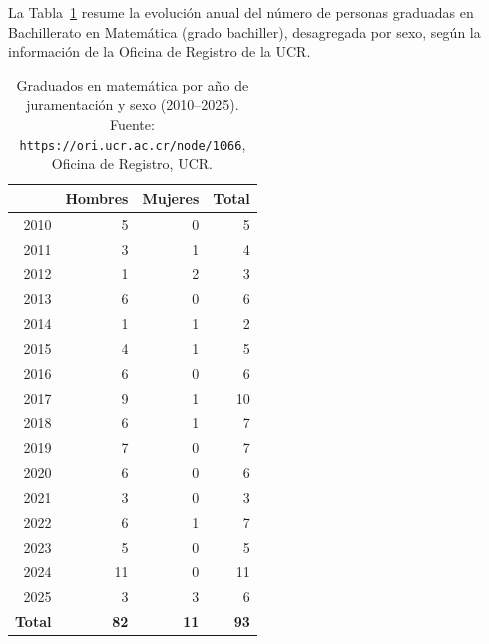 
La Tabla~\ref{tab:graduados-matematica-historico} resume la evolución anual del número de personas graduadas en Bachillerato en Matemática (grado bachiller), desagregada por sexo, según la información de la Oficina de Registro de la UCR.

\begin{table}[H]
\centering
\renewcommand{\arraystretch}{1.15}
\begin{tabular}{|r|r|r|r|}
\hline
\rowcolor[HTML]{00C0F3}
\multicolumn{1}{|c|}{\cellcolor[HTML]{00C0F3}\textbf{Año de juramentación}} & \multicolumn{1}{c|}{\cellcolor[HTML]{00C0F3}\textbf{Hombres}} & \multicolumn{1}{c|}{\cellcolor[HTML]{00C0F3}\textbf{Mujeres}} & \multicolumn{1}{c|}{\cellcolor[HTML]{00C0F3}\textbf{Total}} \\ \hline
2010 & 5 & 0 & 5 \\ \hline
2011 & 3 & 1 & 4 \\ \hline
2012 & 1 & 2 & 3 \\ \hline
2013 & 6 & 0 & 6 \\ \hline
2014 & 1 & 1 & 2 \\ \hline
2015 & 4 & 1 & 5 \\ \hline
2016 & 6 & 0 & 6 \\ \hline
2017 & 9 & 1 & 10 \\ \hline
2018 & 6 & 1 & 7 \\ \hline
2019 & 7 & 0 & 7 \\ \hline
2020 & 6 & 0 & 6 \\ \hline
2021 & 3 & 0 & 3 \\ \hline
2022 & 6 & 1 & 7 \\ \hline
2023 & 5 & 0 & 5 \\ \hline
2024 & 11 & 0 & 11 \\ \hline
2025 & 3 & 3 & 6 \\ \hline
\textbf{Total} & \textbf{82} & \textbf{11} & \textbf{93} \\ \hline
\end{tabular}
\caption{Graduados en matemática por año de juramentación y sexo (2010--2025). Fuente: \texttt{https://ori.ucr.ac.cr/node/1066}, Oficina de Registro, UCR.}
\label{tab:graduados-matematica-historico}
\end{table}
